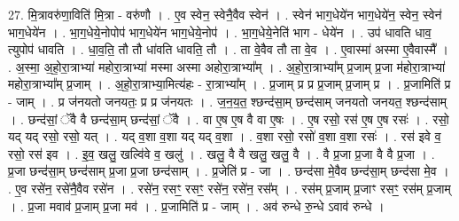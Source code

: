 \documentclass[17pt]{extarticle}
\begin{document}
27. मि॒त्रावरु॑णा॒विति॑ मि॒त्रा - वरु॑णौ । . ए॒व स्वेन॒ स्वेनै॒वैव स्वेन॑ । . स्वेन॑ भाग॒धेये॑न भाग॒धेये॑न॒ स्वेन॒ स्वेन॑ भाग॒धेये॑न । . भा॒ग॒धेये॒नोपोप॑ भाग॒धेये॑न भाग॒धेये॒नोप॑ । . भा॒ग॒धेये॒नेति॑ भाग - धेये॑न । . उप॑ धावति धाव॒ त्युपोप॑ धावति । . धा॒व॒ति॒ तौ तौ धा॑वति धावति॒ तौ । . ता वे॒वैव तौ ता वे॒व । . ए॒वास्मा॑ अस्मा ए॒वैवास्मै᳚ । . अ॒स्मा॒ अ॒हो॒रा॒त्राभ्या॑ महोरा॒त्राभ्या॑ मस्मा अस्मा अहोरा॒त्राभ्या᳚म् । . अ॒हो॒रा॒त्राभ्या᳚म् प्र॒जाम् प्र॒जा म॑होरा॒त्राभ्या॑ महोरा॒त्राभ्या᳚म् प्र॒जाम् । . अ॒हो॒रा॒त्राभ्या॒मित्य॑हः - रा॒त्राभ्या᳚म् । . प्र॒जाम् प्र प्र प्र॒जाम् प्र॒जाम् प्र । . प्र॒जामिति॑ प्र - जाम् । . प्र ज॑नयतो जनयतः॒ प्र प्र ज॑नयतः । . ज॒न॒य॒त॒ श्छन्द॑सा॒म् छन्द॑साम् जनयतो जनयत॒ श्छन्द॑साम् । . छन्द॑सां॒ ॅवै वै छन्द॑सा॒म् छन्द॑सां॒ ॅवै । . वा ए॒ष ए॒ष वै वा ए॒षः । . ए॒ष रसो॒ रस॑ ए॒ष ए॒ष रसः॑ । . रसो॒ यद् यद् रसो॒ रसो॒ यत् । . यद् व॒शा व॒शा यद् यद् व॒शा । . व॒शा रसो॒ रसो॑ व॒शा व॒शा रसः॑ । . रस॑ इवे व॒ रसो॒ रस॑ इव । . इ॒व॒ खलु॒ खल्वि॑वे व॒ खलु॑ । . खलु॒ वै वै खलु॒ खलु॒ वै । . वै प्र॒जा प्र॒जा वै वै प्र॒जा । . प्र॒जा छन्द॑सा॒म् छन्द॑साम् प्र॒जा प्र॒जा छन्द॑साम् । . प्र॒जेति॑ प्र - जा । . छन्द॑सा मे॒वैव छन्द॑सा॒म् छन्द॑सा मे॒व । . ए॒व रसे॑न॒ रसे॑नै॒वैव रसे॑न । . रसे॑न॒ रसꣳ॒॒ रसꣳ॒॒ रसे॑न॒ रसे॑न॒ रस᳚म् । . रस॑म् प्र॒जाम् प्र॒जाꣳ रसꣳ॒॒ रस॑म् प्र॒जाम् । . प्र॒जा मवाव॑ प्र॒जाम् प्र॒जा मव॑ । . प्र॒जामिति॑ प्र - जाम् । . अव॑ रुन्धे रु॒न्धे ऽवाव॑ रुन्धे । \newline
\end{document}
